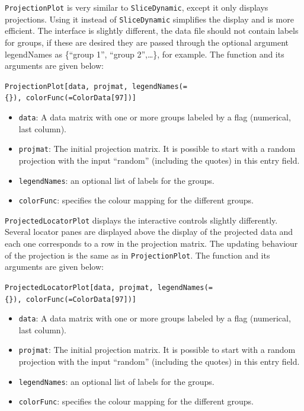 \documentclass[]{interact}
\theoremstyle{plain}%
\theoremstyle{definition}
\theoremstyle{remark}
\providecommand{\tightlist}{%
  \setlength{\itemsep}{0pt}\setlength{\parskip}{0pt}}
\def\tightlist{}
\begin{document}
\texttt{ProjectionPlot} is very similar to \texttt{SliceDynamic}, except
it only displays projections. Using it instead of \texttt{SliceDynamic}
simplifies the display and is more efficient. The interface is slightly
different, the data file should not contain labels for groups, if these
are desired they are passed through the optional argument legendNames as
\{``group 1'', ``group 2'',\ldots\}, for example. The function and its
arguments are given below:

\texttt{ProjectionPlot{[}data,\ projmat,\ legendNames(=\{\}),\ colorFunc(=ColorData{[}97{]}){]}}

\begin{itemize}
\tightlist
\item
  \texttt{data}: A data matrix with one or more groups labeled by a flag
  (numerical, last column).
\item
  \texttt{projmat}: The initial projection matrix. It is possible to
  start with a random projection with the input ``random'' (including
  the quotes) in this entry field.
\item
  \texttt{legendNames}: an optional list of labels for the groups.
\item
  \texttt{colorFunc}: specifies the colour mapping for the different
  groups.
\end{itemize}

\texttt{ProjectedLocatorPlot} displays the interactive controls slightly
differently. Several locator panes are displayed above the display of
the projected data and each one corresponds to a row in the projection
matrix. The updating behaviour of the projection is the same as in
\texttt{ProjectionPlot}. The function and its arguments are given below:

\texttt{ProjectedLocatorPlot{[}data,\ projmat,\ legendNames(=\{\}),\ colorFunc(=ColorData{[}97{]}){]}}

\begin{itemize}
\tightlist
\item
  \texttt{data}: A data matrix with one or more groups labeled by a flag
  (numerical, last column).
\item
  \texttt{projmat}: The initial projection matrix. It is possible to
  start with a random projection with the input ``random'' (including
  the quotes) in this entry field.
\item
  \texttt{legendNames}: an optional list of labels for the groups.
\item
  \texttt{colorFunc}: specifies the colour mapping for the different
  groups.
\end{itemize}
\end{document}
